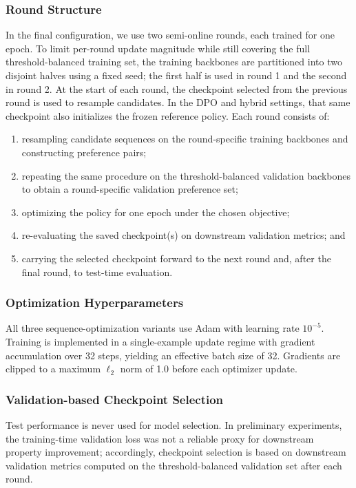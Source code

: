 \documentclass[pdflatex,sn-mathphys-num]{sn-jnl}%
\theoremstyle{thmstyleone}%
\theoremstyle{thmstyletwo}%
\theoremstyle{thmstylethree}%
\begin{document}
\subsubsection{Round Structure}

In the final configuration, we use two semi-online rounds, each trained for one epoch. To limit per-round update magnitude while still covering the full threshold-balanced training set, the training backbones are partitioned into two disjoint halves using a fixed seed; the first half is used in round 1 and the second in round 2. At the start of each round, the checkpoint selected from the previous round is used to resample candidates. In the DPO and hybrid settings, that same checkpoint also initializes the frozen reference policy. Each round consists of:
\begin{enumerate}
\item resampling candidate sequences on the round-specific training backbones and constructing preference pairs;
\item repeating the same procedure on the threshold-balanced validation backbones to obtain a round-specific validation preference set;
\item optimizing the policy for one epoch under the chosen objective;
\item re-evaluating the saved checkpoint(s) on downstream validation metrics; and
\item carrying the selected checkpoint forward to the next round and, after the final round, to test-time evaluation.
\end{enumerate}

\subsubsection{Optimization Hyperparameters}

All three sequence-optimization variants use Adam with learning rate $10^{-5}$. Training is implemented in a single-example update regime with gradient accumulation over 32 steps, yielding an effective batch size of 32. Gradients are clipped to a maximum $\ell_2$ norm of 1.0 before each optimizer update.

\subsubsection{Validation-based Checkpoint Selection}

Test performance is never used for model selection. In preliminary experiments, the training-time validation loss was not a reliable proxy for downstream property improvement; accordingly, checkpoint selection is based on downstream validation metrics computed on the threshold-balanced validation set after each round.
\end{document}
